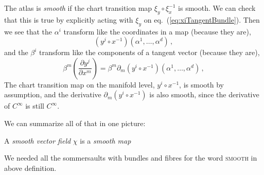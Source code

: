 \documentclass[11pt, a4paper, twocolumn]{article} %
\begin{document}
The atlas is \textit{smooth} if the chart transition map $\xi_y\circ\xi_x^{-1}$ is smooth.
We can check that this is true by explicitly acting with $\xi_y$ on eq.~(\ref{eq:xiTangentBundle}).
Then we see that the $\alpha^i$ transform like the coordinates in a map (because they are),
\begin{equation}
    (y^j\circ x^{-1})(\alpha^1,\ldots,\alpha^d)\,,
\end{equation}
and the
$\beta^i$ transform like the components of a tangent vector (because they are),
\begin{equation}
    \beta^m \left( \frac{\partial y^j}{\partial x^m} \right) = \beta^m \partial_m(y^i\circ x^{-1})(\alpha^1,\ldots,\alpha^d)\,,
\end{equation}
The chart transition map on the manifold level, $y^i\circ x^{-1}$, is smooth by assumption,
and the derivative $\partial_m (y^i \circ x^{-1})$ is also smooth, since the derivative of $C^\infty$ is still $C^\infty$.

We can summarize all of that in one picture:

\begin{center}
\end{center}

\begin{defn}
    A \textit{smooth vector field} $\chi$ is a \textit{smooth map}
    \label{def:vectorField}
    \begin{center}
    \end{center}
\end{defn}
\begin{note}
    We needed all the sommersaults with bundles and fibres for the word \textsc{smooth} in above definition.
\end{note}
\end{document}
